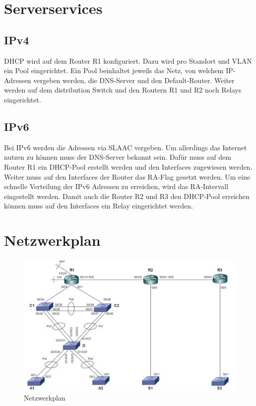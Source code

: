 \documentclass[11pt,a4paper]{scrreprt}
\begin{document}
\newpage
\section{Serverservices}
\subsection{IPv4}
\acs{DHCP} wird auf dem Router R1 konfiguriert. Dazu wird pro Standort und \acs{VLAN} ein Pool eingerichtet. Ein Pool beinhaltet jeweils das Netz, von welchem IP-Adressen vergeben werden, die \acs{DNS}-Server und den Default-Router. Weiter werden auf dem distribution Switch und den Routern R1 und R2 noch Relays eingerichtet.
\subsection{IPv6}
Bei IPv6 werden die Adressen via \acs{SLAAC} vergeben. Um allerdings das Internet nutzen zu können muss der \acs{DNS}-Server bekannt sein. Dafür muss auf dem Router R1 ein \acs{DHCP}-Pool erstellt werden und den Interfaces zugewiesen werden. Weiter muss auf den Interfaces der Router das \acs{RA}-Flag gesetzt werden. Um eine schnelle Verteilung der IPv6 Adressen 
zu erreichen, wird das \acs{RA}-Intervall eingestellt werden. Damit auch die Router R2 und R3 den \acs{DHCP}-Pool erreichen können muss auf den Interfaces ein Relay eingerichtet werden.
\section{Netzwerkplan}

\begin{figure} [H]
\centering
\includegraphics[angle=0,scale=0.43]{Netzwerkplan}
\caption{Netzwerkplan}
\label{abb: Netzwerkplan}
\end{figure}
\newpage
\end{document}
